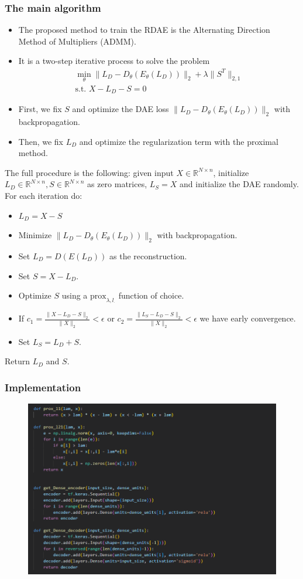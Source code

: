 \documentclass{beamer}
\theoremstyle{plain}
\theoremstyle{definition}
\theoremstyle{remark}
\newcommand{\R}{\mathbb{R}}
\newcommand{\norm}[1]{\lVert#1\rVert}
\newcommand{\prox}{\text{prox}}
\begin{document}
\begin{frame}
	\frametitle{The main algorithm}
	\begin{itemize}
		\item The proposed method to train the RDAE is the Alternating Direction Method of Multipliers (ADMM).
		\item It is a two-step iterative process to solve the problem
			\begin{align}
				\min_{\theta}{\norm{L_D -D_{\theta}(E_{\theta}(L_D))}_2 + \lambda\norm{S^T}_{2,1}}\\
				\text{s.t. }X-L_D-S=0  
			\end{align}
		\item First, we fix $S$ and optimize the DAE loss $\norm{L_D -D_{\theta}(E_{\theta}(L_D))}_2$ with backpropagation.
		\item Then, we fix $L_D$ and optimize the regularization term with the proximal method.
	\end{itemize}
\end{frame}

\begin{frame}
	The full procedure is the following: given input $X\in \R^{N\times n}$, initialize $L_D\in \R^{N\times n}, S\in \R^{N\times n}$ as zero matrices, 
	$L_S = X$ and initialize the DAE randomly. For each iteration do:
	\begin{itemize}
		\item $L_D = X - S$
		\item Minimize $\norm{L_D -D_{\theta}(E_{\theta}(L_D))}_2$ with backpropagation.
		\item Set $L_D = D(E(L_D))$ as the reconstruction.
		\item Set $S = X - L_D$.
		\item Optimize $S$ using a $\prox_{\lambda, l_{\cdot}}$ function of choice.
		\item If $c_1 = \frac{\norm{X-L_D-S}_2}{\norm{X}_2} < \epsilon$ or $c_2 = \frac{\norm{L_S-L_D-S}_2}{\norm{X}_2} < \epsilon$ we have early convergence.
		\item Set $L_S = L_D + S$.
	\end{itemize}
	Return $L_D$ and $S$.
\end{frame}

\begin{frame}
    \frametitle{Implementation}
    \begin{figure}
		\centering
		\includegraphics[width=0.8\linewidth]{Images/code_prox_ae.png}
	\end{figure}
\end{frame}
\end{document}

